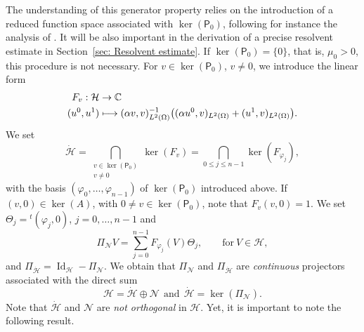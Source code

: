 \documentclass[10pt]{amsart}
\newcommand\mto{\mathchoice{\longmapsto}{\mapsto}{\mapsto}{\mapsto}}
\theoremstyle{plain}
\theoremstyle{definition}
\def\C{\mathbb{C}}
\newcommand{\inp}[2]{(#1, #2)}
\renewcommand{\H}{{\mathcal H}}
\newcommand{\transp}{\ensuremath{\phantom{}^{t}}}
\newcommand{\Pell}{\mathsf P_0}
\DeclareMathOperator{\id}{Id}
\begin{document}
The understanding of this generator property relies on the
introduction of a reduced function space associated with
$\ker (\Pell)$, following for instance the analysis of
\cite{LR:97}. It will be also important in the derivation of a precise
resolvent estimate in Section~\ref{sec: Resolvent estimate}. If
$\ker(\Pell) = \{0\}$, that is, $\mu_0 >0$, this procedure is not
necessary. For $v \in \ker(\Pell)$, $v\neq 0$, we introduce the
linear form
\begin{equation}
\label{eq: linear form ker(P)}
\begin{split}
F_{v}: \H &\to \C\\
(u^0, u^1)
&\mto
\inp{\alpha v}{v}_{L^2(\Omega)}^{-1}
\big(\inp{\alpha u^0}{v}_{L^2(\Omega)}
+ \inp{u^1}{v}_{L^2(\Omega)}
\big).
\end{split}
\end{equation}
We set
\begin{equation}
\label{eq: defintion dot H}
\dot{\H} = \bigcap_{\substack{v \in \ker(\Pell)\\v \neq 0}} \ker (F_{v})
= \bigcap_{0\leq j \leq n-1} \ker (F_{\varphi_j}),
\end{equation}
with the basis $(\varphi_0, \dots,
\varphi_{n-1})$ of $\ker(\Pell)$ introduced above.
If $(v,0) \in \ker (A)$, with $0 \neq
v \in \ker(\Pell)$,
note that $F_{v} (v,0) = 1$.
We set $\Theta_j = \transp (\varphi_j,0)$, $j=0, \dots, n-1$ and
\begin{equation*}
\Pi_{\mathcal N} V = \sum_{j=0}^{n-1} F_{\varphi_j} (V)
\Theta_j,
\qquad \text{for} \ V \in \H,
\end{equation*}
and $\Pi_{\dot{\H}} = \id_{\H} - \Pi_{\mathcal N}$. We obtain that
$\Pi_{\mathcal N}$ and $\Pi_{\dot{\H}}$ are \emph{continuous} projectors associated with
the direct sum
\begin{equation}
\label{eq: decomposition H}
\H = \dot{\H} \oplus \mathcal N
\ \ \text{and} \ \
\dot{\H}= \ker (\Pi_{\mathcal N}).
\end{equation}
Note that
$\dot{\H}$ and ${\mathcal N}$ are \emph{not orthogonal} in $\H$.
Yet, it is important to note the following result.
\end{document}
